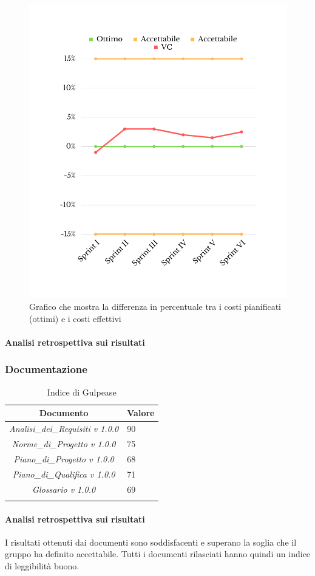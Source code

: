 \begin{figure}[H]
	\centering
	\includegraphics[scale=0.5]{img/CV.png}
	\caption{Grafico che mostra la differenza in percentuale tra i costi pianificati (ottimi) e i costi effettivi}
\end{figure}
\paragraph{Analisi retrospettiva sui risultati}
\subsubsection{Documentazione}
\begin{table}[H]
	\centering
	\setlength\extrarowheight{5pt}
	\renewcommand\tabularxcolumn[1]{>{\Centering}m{#1}}
	\begin{tabularx}{\textwidth}{| c | X |} 
		\hline
		\rowcolor{white}
		\textbf{Documento} & \textbf{Valore}\\
		\hline
		\textit{Analisi\_dei\_Requisiti v 1.0.0} & 90 \\
		\hline
		\textit{Norme\_di\_Progetto v 1.0.0} & 75\\
		\hline
		\textit{Piano\_di\_Progetto v 1.0.0} & 68\\
		\hline
		\textit{Piano\_di\_Qualifica v 1.0.0} & 71\\
		\hline
		\textit{Glossario v 1.0.0} & 69\\
		\hline
		\rowcolor{white}
		\caption{Indice di Gulpease}
	\end{tabularx}
\end{table}
\paragraph{Analisi retrospettiva sui risultati}
I risultati ottenuti dai documenti sono soddisfacenti e superano la soglia che il gruppo ha definito accettabile. Tutti i documenti rilasciati hanno quindi un indice di leggibilità buono.
